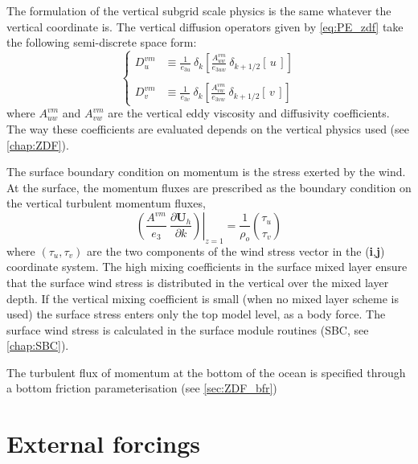 \documentclass[../main/NEMO_manual]{subfiles}
\begin{document}
The formulation of the vertical subgrid scale physics is the same whatever the vertical coordinate is.
The vertical diffusion operators given by \autoref{eq:PE_zdf} take the following semi-discrete space form:
\[
  \left\{
    \begin{aligned}
      D_u^{vm} &\equiv \frac{1}{e_{3u}} \ \delta_k \left[ \frac{A_{uw}^{vm} }{e_{3uw} }
        \ \delta_{k+1/2} [\,u\,]         \right]     \\
      \\
      D_v^{vm} &\equiv \frac{1}{e_{3v}} \ \delta_k \left[ \frac{A_{vw}^{vm} }{e_{3vw} }
        \ \delta_{k+1/2} [\,v\,]         \right]
    \end{aligned}
  \right.
\]
where $A_{uw}^{vm} $ and $A_{vw}^{vm} $ are the vertical eddy viscosity and diffusivity coefficients.
The way these coefficients are evaluated depends on the vertical physics used (see \autoref{chap:ZDF}).

The surface boundary condition on momentum is the stress exerted by the wind.
At the surface, the momentum fluxes are prescribed as the boundary condition on
the vertical turbulent momentum fluxes,
\begin{equation}
  \label{eq:dynzdf_sbc}
  \left.{\left( {\frac{A^{vm} }{e_3 }\ \frac{\partial \textbf{U}_h}{\partial k}} \right)} \right|_{z=1}
  = \frac{1}{\rho_o} \binom{\tau_u}{\tau_v }
\end{equation}
where $\left( \tau_u ,\tau_v \right)$ are the two components of the wind stress vector in
the (\textbf{i},\textbf{j}) coordinate system.
The high mixing coefficients in the surface mixed layer ensure that the surface wind stress is distributed in 
the vertical over the mixed layer depth.
If the vertical mixing coefficient is small (when no mixed layer scheme is used)
the surface stress enters only the top model level, as a body force.
The surface wind stress is calculated in the surface module routines (SBC, see \autoref{chap:SBC}).

The turbulent flux of momentum at the bottom of the ocean is specified through a bottom friction parameterisation
(see \autoref{sec:ZDF_bfr})

\section{External forcings}
\label{sec:DYN_forcing}
\end{document}
